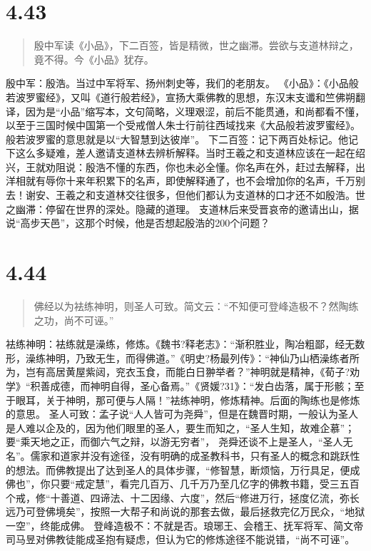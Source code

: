 \documentclass[]{book}
\begin{document}
\section{4.43}\label{section-221}

\begin{quote}
殷中军读《小品》，下二百签，皆是精微，世之幽滞。尝欲与支道林辩之，竟不得。今《小品》犹存。
\end{quote}

殷中军：殷浩。当过中军将军、扬州刺史等，我们的老朋友。
《小品》：《小品般若波罗蜜经》，又叫《道行般若经》，宣扬大乘佛教的思想，东汉末支谶和竺佛朔翻译，因为是``小品''缩写本，文句简略，义理艰涩，前后不能贯通，和尚都看不懂，以至于三国时候中国第一个受戒僧人朱士行前往西域找来《大品般若波罗蜜经》。般若波罗蜜的意思就是以``大智慧到达彼岸''。
下二百签：记下两百处标记。他记下这么多疑难，差人邀请支道林去辨析解释。当时王羲之和支道林应该在一起在绍兴，王就劝阻说：殷浩不懂的东西，你也未必全懂。你名声在外，赶过去解释，出洋相就有辱你十来年积累下的名声，即使解释通了，也不会增加你的名声，千万别去！谢安、王羲之和支道林交往很多，但他们都认为支道林的口才还不如殷浩。世之幽滞：停留在世界的深处。隐藏的道理。
支道林后来受晋哀帝的邀请出山，据说``高步天邑''，这那个时候，他是否想起殷浩的200个问题？

\section{4.44}\label{section-222}

\begin{quote}
佛经以为袪练神明，则圣人可致。简文云：``不知便可登峰造极不？然陶练之功，尚不可诬。''
\end{quote}

袪练神明：袪练就是澡练，修炼。《魏书?释老志》：``渐积胜业，陶冶粗鄙，经无数形，澡练神明，乃致无生，而得佛道。''《明史?杨最列传》：``神仙乃山栖澡练者所为，岂有高居黄屋紫闼，兖衣玉食，而能白日翀举者？''神明就是精神，《荀子?劝学》``积善成德，而神明自得，圣心备焉。''《贤媛?31》：``发白齿落，属于形骸；至于眼耳，关于神明，那可便与人隔！''袪练神明，修炼精神。后面的陶练也是修炼的意思。
圣人可致：孟子说``人人皆可为尧舜''，但是在魏晋时期，一般认为圣人是人难以企及的，因为他们眼里的圣人，要生而知之，``圣人生知，故难企慕''；要``乘天地之正，而御六气之辩，以游无穷者''，
尧舜还谈不上是圣人，``圣人无名''。儒家和道家并没有途径，没有明确的成圣教科书，只有圣人的概念和跳跃性的想法。而佛教提出了达到圣人的具体步骤，``修智慧，断烦恼，万行具足，便成佛也''，你只要``戒定慧''，看完几百万、几千万乃至几亿字的佛教书籍，受三五百个戒，修``十善道、四谛法、十二因缘、六度''，然后``修进万行，拯度亿流，弥长远乃可登佛境矣''，按照一大帮子和尚说的那套去做，最后拯救完亿万民众，``地狱一空''，终能成佛。
登峰造极不：不就是否。琅琊王、会稽王、抚军将军、简文帝司马昱对佛教徒能成圣抱有疑虑，但认为它的修炼途径不能说错，``尚不可诬''。
\end{document}
